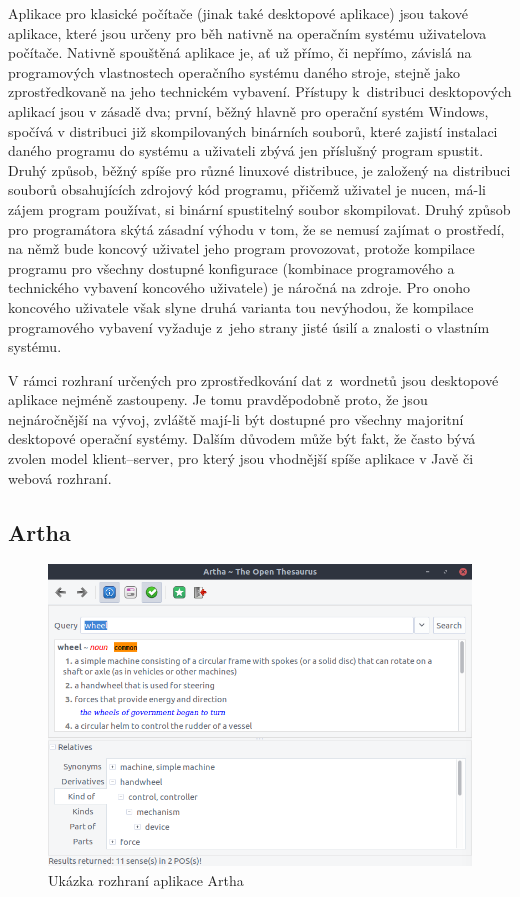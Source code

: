 \documentclass[a4paper, 11pt, oneside, showtrims]{book}
\begin{document}
			Aplikace pro klasické počítače (jinak také desktopové aplikace) jsou takové aplikace, které jsou určeny pro běh nativně na operačním systému uživatelova počítače. Nativně spouštěná aplikace je, ať už přímo, či nepřímo, závislá na programových vlastnostech operačního systému daného stroje, stejně jako zprostředkovaně na jeho technickém vybavení. Přístupy k~distribuci desktopových aplikací jsou v zásadě dva; první, běžný hlavně pro operační systém Windows, spočívá v distribuci již skompilovaných binárních souborů, které zajistí instalaci daného programu do systému a uživateli zbývá jen příslušný program spustit. Druhý způsob, běžný spíše pro různé linuxové distribuce, je založený na distribuci souborů obsahujících zdrojový kód programu, přičemž uživatel je nucen, má-li zájem program používat, si binární spustitelný soubor skompilovat. Druhý způsob pro programátora skýtá zásadní výhodu v tom, že se nemusí zajímat o prostředí, na němž bude koncový uživatel jeho program provozovat, protože kompilace programu pro všechny dostupné konfigurace (kombinace programového a technického vybavení koncového uživatele) je náročná na zdroje. \parencite{Elizabeth2015} Pro onoho koncového uživatele však slyne druhá varianta tou nevýhodou, že kompilace programového vybavení vyžaduje z~jeho strany jisté úsilí a znalosti o vlastním systému. 

			V rámci rozhraní určených pro zprostředkování dat z~wordnetů jsou desktopové aplikace nejméně zastoupeny. Je tomu pravděpodobně proto, že jsou nejnáročnější na vývoj, zvláště mají-li být dostupné pro všechny majoritní desktopové operační systémy. Dalším důvodem může být fakt, že často bývá zvolen model klient--server, pro který jsou vhodnější spíše aplikace v Javě \parencite[13]{gosling1995java} či webová rozhraní.

			\subsection{Artha}

				\begin{figure}[h]
					\centering
					\includegraphics[width=1.0\textwidth]{wnartha-ubuntu.png}
					\caption{Ukázka rozhraní aplikace Artha}
					\label{fig:wnartha-ubuntu}
				\end{figure}
\end{document}
